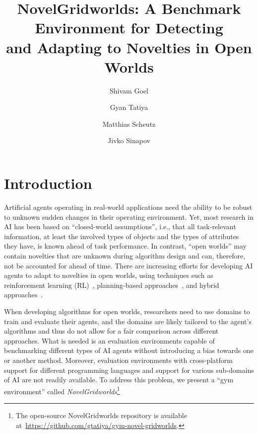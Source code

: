 \documentclass[sigconf]{aamas}
\title{NovelGridworlds: A Benchmark Environment for Detecting\\ and Adapting to Novelties in Open Worlds}
\author{Shivam Goel}
\affiliation{
  \institution{Tufts University}
   \city{Medford, USA}}
\author{Gyan Tatiya}
\affiliation{
  \institution{Tufts University}
  \city{Medford, USA}}
\author{Matthias Scheutz}
\affiliation{
  \institution{Tufts University}
  \city{Medford, USA}}
\author{Jivko Sinapov}
\affiliation{
  \institution{Tufts University}
    \city{Medford, USA}}
\begin{document}

\pagestyle{fancy}
\fancyhead{}


\maketitle 


\section{Introduction}

Artificial agents operating in real-world applications need the ability to be robust to unknown sudden changes in their operating environment.  Yet, most research in AI has been based on ``closed-world assumptions'', i.e., that all task-relevant information, at least the involved types of objects and the types of attributes they have, is known ahead of task performance.  In contrast, ``open worlds'' may contain novelties that are unknown during algorithm design and can, therefore, not be accounted for ahead of time. There are increasing efforts for developing AI agents to adapt to novelties in open worlds, using techniques such as reinforcement learning (RL)~\citep{khetarpal2020towards, padakandla2020reinforcement}, planning-based approaches~\citep{muhammad2021novelty, klenkmodel}, and hybrid approaches~\citep{sarathy2020spotter, peng2021detecting}.

When developing algorithms for open worlds, researchers need to use domains to train and evaluate their agents, and the domains are likely tailored to the agent's algorithms and thus do not allow for a fair comparison across different approaches.  What is needed is an evaluation environments capable of benchmarking different types of AI agents without introducing a bias towards one or another method. Moreover, evaluation environments with cross-platform support for different programming languages and support for various sub-domains of AI are not readily available.  To address this problem, we present a ``gym environment'' called {\em NovelGridworlds}\footnote{The open-source NovelGridworlds repository is available at~\url{https://github.com/gtatiya/gym-novel-gridworlds}.}
\end{document}
